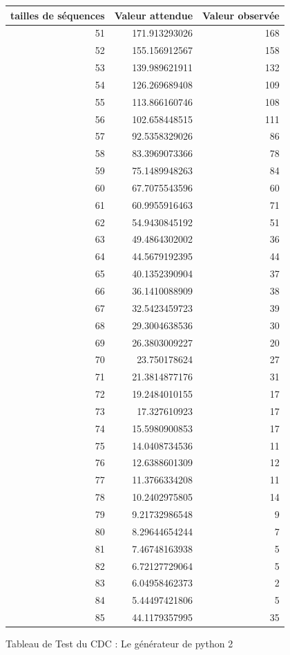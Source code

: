 \documentclass[10pt,a4paper]{article}
\begin{document}
\begin{figure}[h]
\centering
\begin{tabular}{|r|r|r|}
\hline
tailles de séquences & Valeur attendue & Valeur observée\\
\hline
51 & 171.913293026 & 168\\
52 & 155.156912567 & 158\\
53 & 139.989621911 & 132\\
54 & 126.269689408 & 109\\
55 & 113.866160746 & 108\\
56 & 102.658448515 & 111\\
57 & 92.5358329026 & 86\\
58 & 83.3969073366 & 78\\
59 & 75.1489948263 & 84\\
60 & 67.7075543596 & 60\\
61 & 60.9955916463 & 71\\
62 & 54.9430845192 & 51\\
63 & 49.4864302002 & 36\\
64 & 44.5679192395 & 44\\
65 & 40.1352390904 & 37\\
66 & 36.1410088909 & 38\\
67 & 32.5423459723 & 39\\
68 & 29.3004638536 & 30\\
69 & 26.3803009227 & 20\\
70 & 23.750178624 & 27\\
71 & 21.3814877176 & 31\\
72 & 19.2484010155 & 17\\
73 & 17.327610923 & 17\\
74 & 15.5980900853 & 17\\
75 & 14.0408734536 & 11\\
76 & 12.6388601309 & 12\\
77 & 11.3766334208 & 11\\
78 & 10.2402975805 & 14\\
79 & 9.21732986548 & 9\\
80 & 8.29644654244 & 7\\
81 & 7.46748163938 & 5\\
82 & 6.72127729064 & 5\\
83 & 6.04958462373 & 2\\
84 & 5.44497421806 & 5\\
85 & 44.1179357995 & 35\\
\hline
\end{tabular}
\caption{Tableau de Test du CDC : Le générateur de python 2}
\end{figure}
\end{document}
